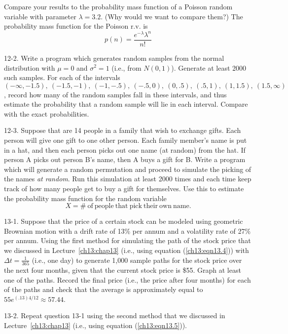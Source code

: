 \documentclass{stml-l}
\theoremstyle{definition}
\numberwithin{equation}{chapter}
\numberwithin{figure}{chapter}
\numberwithin{figure}{section}
\begin{document}
Compare your results to the probability mass function of a Poisson
random variable with parameter $\lambda=3.2$. (Why would we want to
compare them?) The probability mass function for the Poisson r.v. is
\begin{equation*}
p(n)=\frac{e^{-\lambda}\lambda^{n}}{n!}
\end{equation*}

12-2. Write a program which generates random samples from the normal
distribution with $\mu=0$ and $\sigma^{2}=1$ (i.e., from $N(0,1)$).
Generate at least 2000 such samples. For each of the intervals
$(-\infty,-1.5),\ (-1.5,-1),\ (-1,-.5),\ (-.5,0),\ (0, .5),\ (.5,
1),\ (1, 1.5),\ (1.5,\infty)$, record how many of the random samples
fall in these intervals, and thus estimate the probability that a
random sample will lie in each interval. Compare with the exact
probabilities.

12-3. Suppose that are 14 people in a family that wish to exchange
gifts. Each person will give one gift to one other person. Each
family member's name is put in a hat, and then each person picks out
one name (at random) from the hat. If person A picks out person B's
name, then A buys a gift for B. Write a program which will generate
a random permutation and proceed to simulate the picking of the
names \emph{at random}. Run this simulation at least 2000 times and
each time keep track of how many people get to buy a gift for
themselves. Use this to estimate the probability mass function for
the random variable
\begin{equation*}
X=\#\ \mathrm{of\ people\ that\ pick\ their\ own\ name}.
\end{equation*}

13-1. Suppose that the price of a certain stock can be modeled using
geometric Brownian motion with a drift rate of 13\% per annum and a
volatility rate of 27\% per annum. Using the first method for
simulating the path of the stock price that we discussed in
Lecture~\ref{ch13:chap13} (i.e., using equation
(\ref{ch13:eqn13.4})) with $\Delta t=\frac{1}{365}$ (i.e., one day)
to generate 1,000 sample paths for the stock price over the next
four months, given that the current stock price is {\$}55. Graph at
least one of the paths. Record the final price (i.e., the price
after four months) for each of the paths and check that the average
is approximately equal to $55e^{(.13)4/12}\approx 57.44$.

13-2. Repeat question 13-1 using the second method that we discussed
in Lecture~\ref{ch13:chap13} (i.e., using equation
(\ref{ch13:eqn13.5})).
\end{document}
